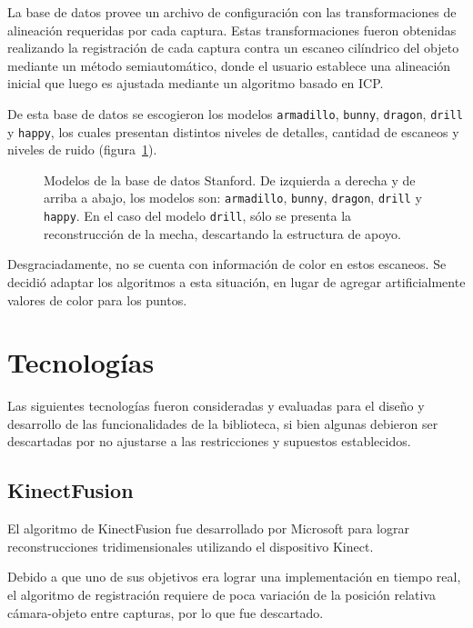 La base de datos provee un archivo de configuración con las transformaciones de
alineación requeridas por cada captura.
Estas transformaciones fueron obtenidas realizando la registración de cada captura
contra un escaneo cilíndrico del objeto mediante un método semiautomático, donde el usuario
establece una alineación inicial que luego es ajustada mediante un algoritmo
basado en ICP\cite{Turk:1994:ZPM:192161.192241}.

De esta base de datos se escogieron los modelos
	\texttt{armadillo},
	\texttt{bunny},
	\texttt{dragon},
	\texttt{drill} y
	\texttt{happy},
los cuales presentan distintos niveles de detalles, cantidad de escaneos y niveles de ruido (figura~\ref{fig:stanford_models}).

\begin{figure}
	\caption[Modelos de la base de datos Stanford]{\label{fig:stanford_models}Modelos de la base de datos Stanford.
		De izquierda a derecha y de arriba a abajo, los modelos son:
		\texttt{armadillo},
		\texttt{bunny},
		\texttt{dragon},
		\texttt{drill}
		y \texttt{happy}.
		En el caso del modelo \texttt{drill}, sólo se presenta la reconstrucción de la mecha, descartando la estructura de apoyo.}
\end{figure}


Desgraciadamente, no se cuenta con información de color en estos escaneos.
Se decidió adaptar los algoritmos a esta situación, en lugar de agregar
artificialmente valores de color para los puntos.


\section{Tecnologías}
Las siguientes tecnologías fueron consideradas y evaluadas
para el diseño y desarrollo de las funcionalidades de la biblioteca,
si bien algunas debieron ser descartadas por no ajustarse a las restricciones
y supuestos establecidos.

	\subsection{KinectFusion}
	El algoritmo de KinectFusion fue desarrollado por Microsoft
	para lograr reconstrucciones tridimensionales utilizando el dispositivo Kinect.

	Debido a que uno de sus objetivos era lograr una implementación en tiempo
	real, el algoritmo de registración requiere de poca variación
	de la posición relativa cámara-objeto entre capturas, por lo que fue descartado.

